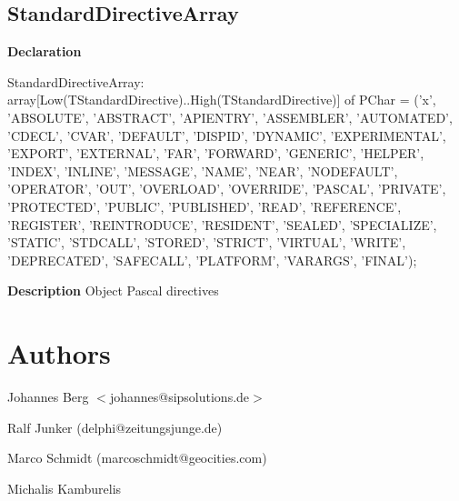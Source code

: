 \documentclass{report}
\newif\ifpdf
\begin{document}
\subsection*{StandardDirectiveArray}
\fi
\label{PasDoc_Tokenizer-StandardDirectiveArray}
\begin{list}{}{
\setlength{\itemindent}{0cm}
\setlength{\listparindent}{0cm}
\setlength{\leftmargin}{\evensidemargin}
\addtolength{\leftmargin}{\tmplength}
\settowidth{\labelsep}{X}
\addtolength{\leftmargin}{\labelsep}
\setlength{\labelwidth}{\tmplength}
}
\item[\textbf{Declaration}\hfill]
\ifpdf
\begin{flushleft}
\fi
\begin{ttfamily}
StandardDirectiveArray:
    array[Low(TStandardDirective)..High(TStandardDirective)] of PChar =
  ('x', 
    'ABSOLUTE', 'ABSTRACT', 'APIENTRY', 'ASSEMBLER', 'AUTOMATED',
    'CDECL', 'CVAR', 'DEFAULT', 'DISPID', 'DYNAMIC', 'EXPERIMENTAL', 'EXPORT', 'EXTERNAL',
    'FAR', 'FORWARD', 'GENERIC', 'HELPER', 'INDEX', 'INLINE', 'MESSAGE', 'NAME', 'NEAR',
    'NODEFAULT', 'OPERATOR', 'OUT', 'OVERLOAD', 'OVERRIDE', 'PASCAL', 'PRIVATE',
    'PROTECTED', 'PUBLIC', 'PUBLISHED', 'READ', 'REFERENCE', 'REGISTER',
    'REINTRODUCE', 'RESIDENT', 'SEALED', 'SPECIALIZE', 'STATIC',
    'STDCALL', 'STORED', 'STRICT', 'VIRTUAL',
    'WRITE', 'DEPRECATED', 'SAFECALL', 'PLATFORM', 'VARARGS', 'FINAL');\end{ttfamily}

\ifpdf
\end{flushleft}
\fi

\par
\item[\textbf{Description}]
Object Pascal directives

\end{list}
\section{Authors}
\par
Johannes Berg {$<$}johannes@sipsolutions.de{$>$}

\par
Ralf Junker (delphi@zeitungsjunge.de)

\par
Marco Schmidt (marcoschmidt@geocities.com)

\par
Michalis Kamburelis
\end{document}
